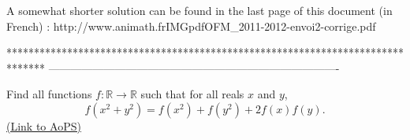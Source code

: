 \begin{solution}
	A somewhat shorter solution can be found in the last page of this document (in French) : http://www.animath.fr\/IMG\/pdf\/OFM_2011-2012-envoi2-corrige.pdf
\end{solution}
*******************************************************************************
-------------------------------------------------------------------------------

\begin{problem}
	Find all functions $f: \mathbb R \to \mathbb R$ such that for all reals $x$ and $y$,
\[ f(x^2+y^2)=f(x^2)+f(y^2)+2f(x)f(y).\]
	\flushright \href{https://artofproblemsolving.com/community/c6h384406}{(Link to AoPS)}
\end{problem}



